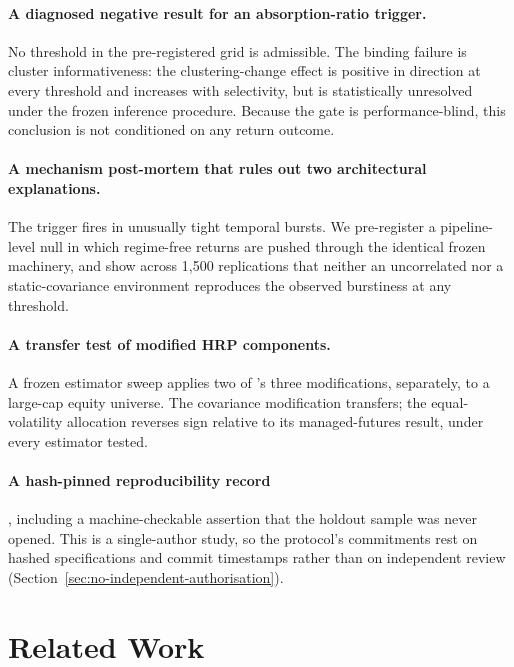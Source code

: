 \documentclass[12pt,letterpaper]{article}
\begin{document}
\paragraph{A diagnosed negative result for an absorption-ratio trigger.} No threshold in
the pre-registered grid is admissible. The binding failure is cluster
informativeness: the clustering-change effect is positive in direction at every
threshold and increases with selectivity, but is statistically unresolved under the
frozen inference procedure. Because the gate is performance-blind, this conclusion is
not conditioned on any return outcome.

\paragraph{A mechanism post-mortem that rules out two architectural explanations.}
The trigger fires in unusually tight temporal bursts. We pre-register a
pipeline-level null in which regime-free returns are pushed through the identical
frozen machinery, and show across 1{,}500 replications that neither an uncorrelated
nor a static-covariance environment reproduces the observed burstiness at any
threshold.

\paragraph{A transfer test of modified HRP components.} A frozen estimator sweep
applies two of \citeauthor{molyboga2020}'s \citeyearpar{molyboga2020} three
modifications, separately, to a large-cap equity universe. The covariance modification
transfers; the equal-volatility allocation reverses sign relative to its
managed-futures result, under every estimator tested.

\paragraph{A hash-pinned reproducibility record}, including a machine-checkable
assertion that the holdout sample was never opened. This is a single-author study, so
the protocol's commitments rest on hashed specifications and commit timestamps rather
than on independent review (Section~\ref{sec:no-independent-authorisation}).

\section{Related Work}
\end{document}
